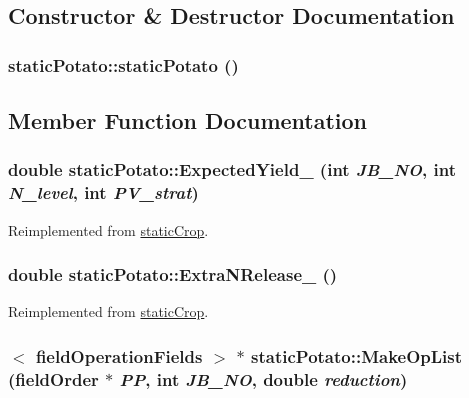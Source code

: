 \subsection{Constructor \& Destructor Documentation}
\hypertarget{classstatic_potato_a56c75183e4ef8ad16971e8174ff723e9}{
\subsubsection[{staticPotato}]{\setlength{\rightskip}{0pt plus 5cm}staticPotato::staticPotato ()}}
\label{classstatic_potato_a56c75183e4ef8ad16971e8174ff723e9}


\subsection{Member Function Documentation}
\hypertarget{classstatic_potato_a6e59765e958566c544bc53669160f6d7}{
\subsubsection[{ExpectedYield\_\-}]{\setlength{\rightskip}{0pt plus 5cm}double staticPotato::ExpectedYield\_\- (int {\em JB\_\-NO}, \/  int {\em N\_\-level}, \/  int {\em PV\_\-strat})}}
\label{classstatic_potato_a6e59765e958566c544bc53669160f6d7}


Reimplemented from \hyperlink{classstatic_crop_ab7b9a8ecb31b10c4dcf44f13000e2f8c}{staticCrop}.\hypertarget{classstatic_potato_a7c404064c9e42ef804e9d4cf795f2759}{
\subsubsection[{ExtraNRelease\_\-}]{\setlength{\rightskip}{0pt plus 5cm}double staticPotato::ExtraNRelease\_\- ()}}
\label{classstatic_potato_a7c404064c9e42ef804e9d4cf795f2759}


Reimplemented from \hyperlink{classstatic_crop_afe0cb8a7831afa941a37338f05227d67}{staticCrop}.\hypertarget{classstatic_potato_ad9c39d522caf3253ba0e10b240c9ede8}{
\subsubsection[{MakeOpList}]{$<$ {\bf fieldOperationFields} $>$ $\ast$ staticPotato::MakeOpList ({\bf fieldOrder} $\ast$ {\em PP}, \/  int {\em JB\_\-NO}, \/  double {\em reduction})}}
\label{classstatic_potato_ad9c39d522caf3253ba0e10b240c9ede8}


